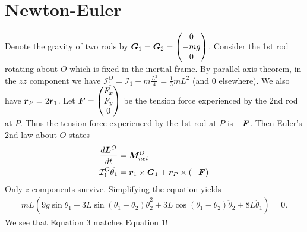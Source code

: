 \documentclass[11pt]{article}
\begin{document}
\section{Newton-Euler}
Denote the gravity of two rods by $ {\bm{ G}}_1 = {\bm{ G}}_2 = \begin{pmatrix} 0\\-mg\\0 \end{pmatrix}$. Consider the 1st rod rotating about $ O$ which is fixed in the inertial frame. By parallel axis theorem, in the $ zz$ component we have $ \mathcal{ I}_1^{O} = \mathcal{ I}_1 + m\frac{L^2}{4} = \frac{1}{3} m L^2$ (and 0 elsewhere). We also have $ {\bm{ r}}_P = 2 {\bm{ r}}_1$. Let $ {\bm{ F}} = \begin{pmatrix} F_x \\ F_y \\0 \end{pmatrix}  $ be the tension force experienced by the 2nd rod at $ P$. Thus the tension force experienced by the 1st rod at $ P$ is $ -{\bm{ F}} $.  Then Euler's 2nd law about $ O$ states
\begin{align*}
	\frac{d {\bm{ L}}^{O} }{ dt} &= {\bm{ M}}_{net}^{O}  \\
	\mathcal{ I}_1^{O} \ddot{\theta_1} &= {\bm{ r}}_1 \times {\bm{ G}}_1 + {\bm{ r}}_P \times (-{\bm{ F}})  
\end{align*}
Only $ z$-components survive. Simplifying the equation yields
\begin{align}
	mL \left( 9g \sin \theta_1 + 3L \sin (\theta_1 - \theta_2) \dot{\theta}_2^2 + 3L\cos (\theta_1 - \theta_2) \ddot{\theta}_2 + 8L \ddot{\theta}_1 \right) = 0 .
\end{align}
We see that Equation 3 matches Equation 1!
\end{document}
